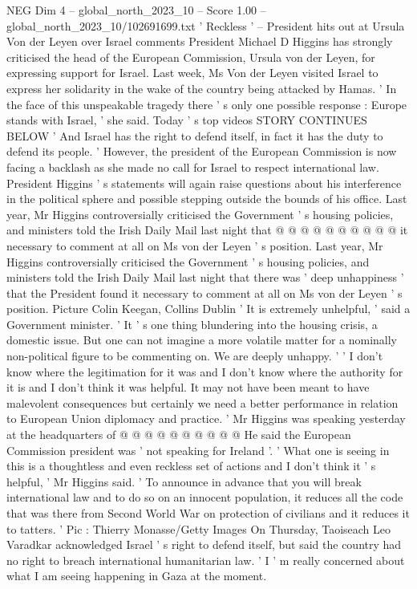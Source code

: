 \begin{textsample}{NEG Dim 4 – global\_north\_2023\_10 – Score 1.00 – global\_north\_2023\_10/102691699.txt}  \label{ex:f4_neg_014}
' Reckless ' -- President hits out at Ursula Von der Leyen over Israel comments President Michael D Higgins has strongly criticised the head of the European Commission, Ursula von der Leyen, for expressing support for Israel.
Last week, Ms Von der Leyen visited Israel to express her solidarity in the wake of the country being attacked by Hamas. ' In the face of this unspeakable tragedy there ' s only one possible response : Europe stands with Israel, ' she said.
Today ' s top videos STORY CONTINUES BELOW ' And Israel has the right to defend itself, in fact it has the duty to defend its people. ' However, the president of the European Commission is now facing a backlash as she made no call for Israel to respect international law.
President Higgins ' s statements will again raise questions about his interference in the political sphere and possible stepping outside the bounds of his office.
Last year, Mr Higgins controversially criticised the Government ' s housing policies, and ministers told the Irish Daily Mail last night that @ @ @ @ @ @ @ @ @ @ it necessary to comment at all on Ms von der Leyen ' s position.
Last year, Mr Higgins controversially criticised the Government ' s housing policies, and ministers told the Irish Daily Mail last night that there was ' deep unhappiness ' that the President found it necessary to comment at all on Ms von der Leyen ' s position.
Picture Colin Keegan, Collins Dublin ' It is extremely unhelpful, ' said a Government minister. ' It ' s one thing blundering into the housing crisis, a domestic issue.
But one can not imagine a more volatile matter for a nominally non-political figure to be commenting on.
We are deeply unhappy. ' ' I don't know where the legitimation for it was and I don't know where the authority for it is and I don't think it was helpful.
It may not have been meant to have malevolent consequences but certainly we need a better performance in relation to European Union diplomacy and practice. ' Mr Higgins was speaking yesterday at the headquarters of @ @ @ @ @ @ @ @ @ @ He said the European Commission president was ' not speaking for Ireland '. ' What one is seeing in this is a thoughtless and even reckless set of actions and I don't think it ' s helpful, ' Mr Higgins said. ' To announce in advance that you will break international law and to do so on an innocent population, it reduces all the code that was there from Second World War on protection of civilians and it reduces it to tatters. ' Pic : Thierry Monasse/Getty Images On Thursday, Taoiseach Leo Varadkar acknowledged Israel ' s right to defend itself, but said the country had no right to breach international humanitarian law. ' I ' m really concerned about what I am seeing happening in Gaza at the moment.

\end{textsample}
